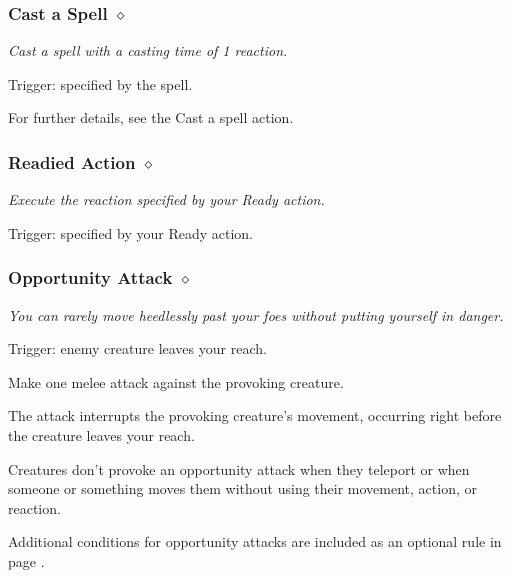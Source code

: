\subsubsection{Cast a Spell $\diamond$} \label{act::castaspell}
    \textit{Cast a spell with a casting time of 1 reaction.}

    Trigger: specified by the spell.

    For further details, see the Cast a spell action.
\subsubsection{Readied Action $\diamond$} \label{act::readiedaction}
    \textit{Execute the reaction specified by your Ready action.}

    Trigger: specified by your Ready action.
\subsubsection{Opportunity Attack $\diamond$} \label{act::opportunityattack}
    \textit{You can rarely move heedlessly past your foes without putting yourself in danger.}

    Trigger: enemy creature leaves your reach.

    Make one melee attack against the provoking creature.

    The attack interrupts the provoking creature's movement, occurring right before the creature leaves your reach.

    Creatures don't provoke an opportunity attack when they teleport or when someone or something moves them without using their movement, action, or reaction.

    Additional conditions for opportunity attacks are included as an optional rule in page \pageref{rule::opportunityattacks}.
